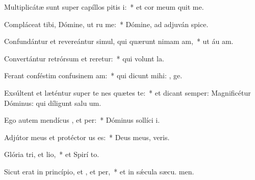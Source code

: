 \item Multiplicátæ sunt super capíllos pitis i:~* et cor meum quit me.
\item Compláceat tibi, Dómine, ut ru me:~* Dómine, ad adjuván  spice.
\item Confundántur et revereántur simul, qui quærunt nimam am,~* ut áu am.
\item Convertántur retrórsum et reretur:~* qui volunt  la.
\item Ferant conféstim confusinem am:~* qui dicunt mihi: , ge.
\item Exsúltent et læténtur super te nes quætes te:~* et dicant semper: Magnificétur Dóminus: qui díligunt salu um.
\item Ego autem mendícus , et per:~* Dóminus sollíci  i.
\item Adjútor meus et protéctor us  es:~* Deus meus,  veris.
\item Glória tri, et lio,~* et Spirí to.
\item Sicut erat in princípio, et , et per,~* et in sǽcula sæcu. men.
